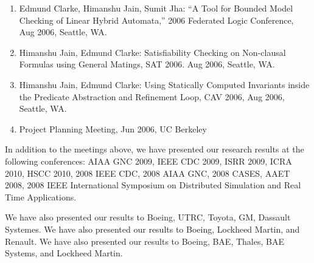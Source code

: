 \begin{enumerate}
\item Edmund Clarke, Himanshu Jain, Sumit Jha: ``A Tool for Bounded Model Checking of Linear Hybrid Automata,'' 2006 Federated Logic Conference, Aug 2006, Seattle, WA. 

\item Himanshu Jain, Edmund Clarke: Satisfiability Checking on Non-clausal Formulas using General Matings, SAT 2006. Aug 2006, Seattle, WA.
\item Himanshu Jain, Edmund Clarke: Using Statically Computed Invariants inside the Predicate Abstraction and Refinement Loop, CAV 2006, Aug 2006, Seattle, WA.

\item Project Planning Meeting, Jun 2006, UC Berkeley

\end{enumerate}

In addition to the meetings above, we have presented our research results at the following conferences:  AIAA GNC 2009, IEEE CDC 2009, ISRR 2009, ICRA 2010, HSCC 2010, 2008 IEEE CDC, 2008 AIAA GNC, 2008 CASES, AAET 2008, 2008 IEEE International Symposium on Distributed Simulation and Real Time Applications.

We have also presented our results to Boeing, UTRC, Toyota, GM, Dassault Systemes.
We have also presented our results to Boeing, Lockheed Martin, and Renault.
We have also presented our results to Boeing, BAE, Thales, BAE Systems, and Lockheed Martin.

